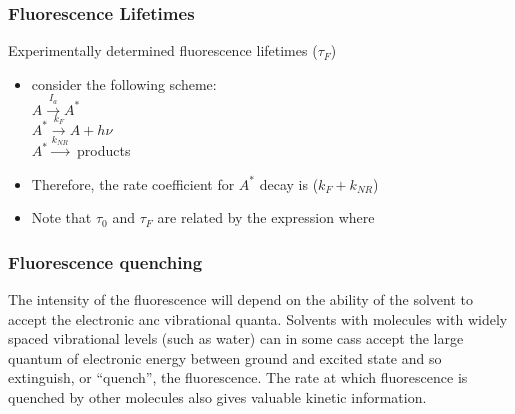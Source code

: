 \documentclass[ignorenonframetext]{beamer}
\begin{document}
\begin{frame}[label=experimentallifetimes]
\frametitle{Fluorescence Lifetimes}
Experimentally determined fluorescence lifetimes (\(\tau_F\))\\
\begin{itemize}[<+->]
\item consider the following scheme:\\
\qquad \(A \xrightarrow{I_a} A^*\) \\
\qquad \(A^* \xrightarrow{k_F} A + h\nu\)\\
\qquad \(A^* \xrightarrow{k_{NR}} \) products
\item Therefore, the rate coefficient for \(A^*\) decay is (\(k_F + k_{NR}\))\\
\begin{center}  \end{center}
\item Note that \(\tau_0\) and \(\tau_F\) are related by the expression  \quad where 
\hyperlink{fluorescencelifetimes<8>}{}
\end{itemize}
\end{frame}

\begin{frame}
\frametitle{Fluorescence quenching}
\end{frame}

The intensity of the fluorescence will depend on the ability of the solvent to accept the electronic anc vibrational quanta. Solvents with molecules with widely spaced vibrational levels (such as water) can in some cass accept the large quantum of electronic energy between ground and excited state and so extinguish, or ``quench'', the fluorescence. The rate at which fluorescence is quenched by other molecules also gives valuable kinetic information.
\end{document}
